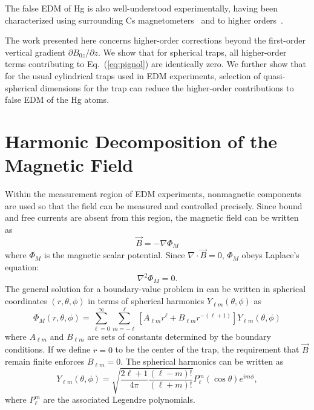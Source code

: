 \documentclass[preprint,12pt]{elsarticle}
\begin{document}
The false EDM of Hg is also well-understood experimentally, having
been characterized using surrounding Cs magnetometers~\cite{bib:hgcs}
and to higher orders~\cite{bib:komposch}.

The work presented here concerns higher-order corrections beyond the
first-order vertical gradient $\partial B_{0z}/\partial z$.  We show
that for spherical traps, all higher-order terms contributing to
Eq.~(\ref{eq:pignol}) are identically zero.  We further show that for
the usual cylindrical traps used in EDM experiments, selection of
quasi-spherical dimensions for the trap can reduce the higher-order
contributions to false EDM of the Hg atoms.


\section{Harmonic Decomposition of the Magnetic Field}

Within the measurement region of EDM experiments, nonmagnetic
components are used so that the field can be measured and controlled
precisely.  Since bound and free currents are absent from this region,
the magnetic field can be written as~\cite{bib:jackson}
\begin{equation}
\vec{B}=-\nabla\Phi_M
\end{equation}
where $\Phi_M$ is the magnetic scalar potential.  Since
$\nabla\cdot\vec{B}=0$, $\Phi_M$ obeys Laplace's equation:
\begin{equation}
\nabla^2\Phi_M=0.
\end{equation}
The general solution for a boundary-value problem in can be written in
spherical coordinates $(r,\theta,\phi)$ in terms of spherical
harmonics $Y_{\ell m}(\theta,\phi)$ as
\begin{equation}\label{eq:boundaryvalue}
  \Phi_M(r,\theta,\phi)=\sum_{\ell=0}^\infty\sum_{m=-\ell}^\ell\left[A_{\ell m}r^\ell+B_{\ell m}r^{-(\ell+1)}\right]Y_{\ell m}(\theta,\phi)
\end{equation}
where $A_{\ell m}$ and $B_{\ell m}$ are sets of constants determined
by the boundary conditions.  If we define $r=0$ to be the center of
the trap, the requirement that $\vec{B}$ remain finite enforces
$B_{\ell m}=0$.  The spherical harmonics can be written as
\begin{equation}
    Y_{\ell m}(\theta,\phi)=\sqrt{\frac{2\ell+1}{4\pi}\frac{(\ell-m)!}{(\ell+m)!}}P_{\ell}^{m}(\cos\theta)e^{im\phi},
\end{equation}
where $P_{\ell}^{m}$ are the associated Legendre polynomials.  
\end{document}
